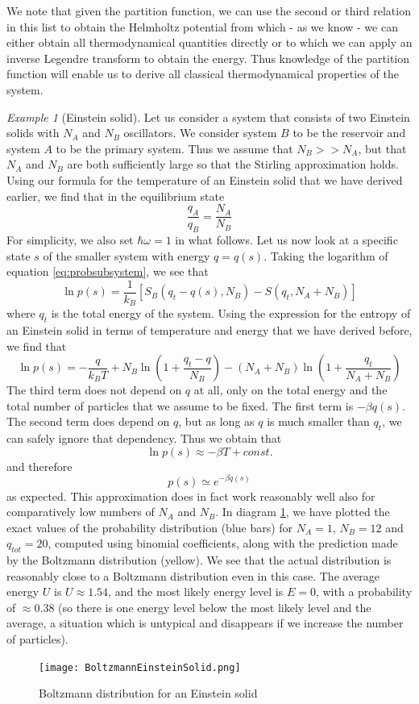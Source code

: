 \documentclass[a4paper, draft]{report}
\numberwithin{section}{chapter}
\numberwithin{equation}{chapter}
\theoremstyle{own}
\theoremstyle{remark}
\newtheorem{example}{Example}[section]
\begin{document}
We note that given the partition function, we can use the second or third relation in this list to obtain the Helmholtz potential from which - as we know - we can either obtain all thermodynamical quantities directly or to which we can apply an inverse Legendre transform to obtain the energy. Thus knowledge of the partition function will enable us to derive all classical thermodynamical properties of the system.

\begin{example}[Einstein solid]
Let us consider a system that consists of two Einstein solids with $N_A$ and $N_B$ oscillators. We consider system $B$ to be the reservoir and system $A$ to be the primary system. Thus we assume that $N_B >> N_A$, but that $N_A$ and $N_B$ are both sufficiently large so that the Stirling approximation holds. Using our formula for the temperature of an Einstein solid that we have derived earlier, we find that in the equilibrium state
$$
\frac{q_A}{q_B} = \frac{N_A}{N_B}
$$
For simplicity, we also set $\hbar \omega = 1$ in what follows. Let us now look at a specific state $s$ of the smaller system with energy $q = q(s)$. Taking the logarithm of equation 
\eqref{eq:probsubsystem}, we see that
$$
\ln p(s) = \frac{1}{k_B} [S_B(q_t - q(s), N_B) - S(q_t, N_A + N_B)]
$$
where $q_t$ is the total energy of the system. Using the expression for the entropy of an Einstein solid in terms of temperature and energy that we have derived before, we find that
$$
\ln p(s) = - \frac{q}{k_BT} + N_B \ln (1 + \frac{q_t-q}{N_B}) 
- (N_A + N_B) \ln (1 + \frac{q_t}{N_A + N_B})
$$
The third term does not depend on $q$ at all, only on the total energy and the total number of particles that we assume to be fixed. The first term is $- \beta q(s)$. The second term does depend on $q$, but as long as $q$ is much smaller than $q_t$, we can safely ignore that dependency. Thus we obtain that
$$
\ln p(s) \approx - \beta T + const.
$$ 
and therefore 
$$
p(s) \simeq e^{-\beta q(s)}
$$
as expected. This approximation does in fact work reasonably well also for comparatively low numbers of $N_A$ and $N_B$. In diagram \ref{fig:BoltzmannEinsteinSolid}, we have plotted the exact values of the probability distribution (blue bars) for $N_A = 1$, $N_B = 12$ and $q_{tot} = 20$, computed using binomial coefficients, along with the prediction made by the Boltzmann distribution (yellow). We see that the actual distribution is reasonably close to a Boltzmann distribution even in this case. The average energy $U$ is $U \approx 1.54$, and the most likely energy level is $E = 0$, with a probability of $\approx 0.38$ (so there is one energy level below the most likely level and the average, a situation which is untypical and disappears if we increase the number of particles).

\begin{figure}[ht]
\centering
\texttt{[image: BoltzmannEinsteinSolid.png]}
\caption{Boltzmann distribution for an Einstein solid}
\label{fig:BoltzmannEinsteinSolid}
\end{figure}


\end{example}
\end{document}
